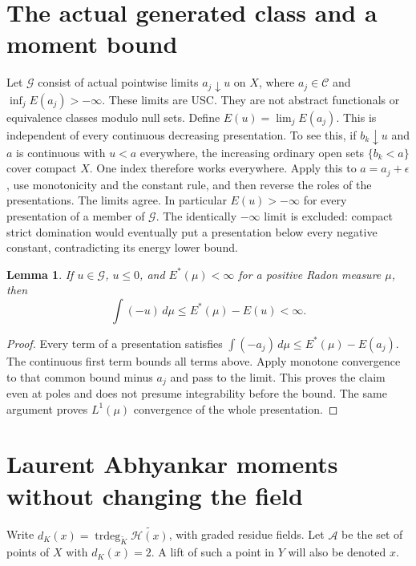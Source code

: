 \documentclass[11pt]{article}
\newcommand{\C}{\mathcal C}
\newcommand{\G}{\mathcal G}
\newtheorem{lemma}[theorem]{Lemma}
\theoremstyle{remark}\newtheorem{remark}[theorem]{Remark}
\begin{document}
\section{The actual generated class and a moment bound}
Let $\G$ consist of actual pointwise limits
$a_j\downarrow u$ on $X$, where $a_j\in\C$ and
$\inf_jE(a_j)>-\infty$. These limits are USC.
They are not abstract functionals or equivalence classes modulo
null sets. Define $E(u)=\lim_jE(a_j)$.
This is independent of every continuous decreasing presentation.
To see this, if $b_k\downarrow u$ and $a$ is continuous with $u<a$
everywhere, the increasing ordinary open sets $\{b_k<a\}$ cover
compact $X$. One index therefore works everywhere. Apply this to
$a=a_j+\epsilon$, use monotonicity and the constant rule, and
then reverse the roles of the presentations. The limits agree.
In particular $E(u)>-\infty$ for every presentation of a member
of $\G$. The identically $-\infty$ limit is excluded: compact
strict domination would eventually put a presentation below every
negative constant, contradicting its energy lower bound.

\begin{lemma}\label{moment}
If $u\in\G$, $u\le0$, and $E^*(\mu)<\infty$ for a positive
Radon measure $\mu$, then
\[
 \int(-u)\,d\mu\le E^*(\mu)-E(u)<\infty.
\]
\end{lemma}
\begin{proof}
Every term of a presentation satisfies
$\int(-a_j)\,d\mu\le E^*(\mu)-E(a_j)$.
The continuous first term bounds all terms above. Apply monotone
convergence to that common bound minus $a_j$ and pass to the limit.
This proves the claim even at poles and does not presume
integrability before the bound. The same argument proves
$L^1(\mu)$ convergence of the whole presentation.
\end{proof}

\section{Laurent Abhyankar moments without changing the field}
Write $d_K(x)=\operatorname{trdeg}_{\widetilde K}
\widetilde{\mathscr H(x)}$, with graded residue fields.
Let $\mathscr A$ be the set of points of $X$ with $d_K(x)=2$.
A lift of such a point in $Y$ will also be denoted $x$.
\end{document}
